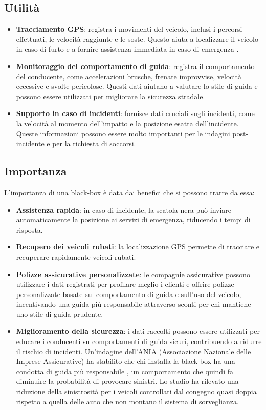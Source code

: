 \documentclass[12pt, a4paper, italian]{report}
\numberwithin{figure}{chapter}
\numberwithin{table}{chapter}
\begin{document}
\subsection{Utilità}
\begin{itemize}
    \item \textbf{Tracciamento GPS}: registra i movimenti del veicolo, inclusi i percorsi effettuati, le velocità raggiunte e le soste. Questo aiuta a localizzare il veicolo in caso di furto e a fornire assistenza immediata in caso di emergenza \cite{khin2018real}.
    \item \textbf{Monitoraggio del comportamento di guida}: registra il comportamento del conducente, come accelerazioni brusche, frenate improvvise, velocità eccessive e svolte pericolose. Questi dati aiutano a valutare lo stile di guida e possono essere utilizzati per migliorare la sicurezza stradale. \cite{hermawan2020acquisition}
    \item \textbf{Supporto in caso di incidenti}: fornisce dati cruciali sugli incidenti, come la velocità al momento dell'impatto e la posizione esatta dell'incidente. Queste informazioni possono essere molto importanti per le indagini post-incidente e per la richiesta di soccorsi. \cite{thompson2010using}
\end{itemize}
\subsection{Importanza}
L'importanza di una black-box è data dai benefici che si possono trarre da essa: 
\begin{itemize}
    \item \textbf{Assistenza rapida}: in caso di incidente, la scatola nera può inviare automaticamente la posizione ai servizi di emergenza, riducendo i tempi di risposta.
    \item \textbf{Recupero dei veicoli rubati}: la localizzazione GPS permette di tracciare e recuperare rapidamente veicoli rubati.
    \item \textbf{Polizze assicurative personalizzate}: le compagnie assicurative possono utilizzare i dati registrati per profilare meglio i clienti e offrire polizze personalizzate basate sul comportamento di guida e sull'uso del veicolo, incentivando una guida più responsabile attraverso sconti per chi mantiene uno stile di guida prudente.
    \item \textbf{Miglioramento della sicurezza}: i dati raccolti possono essere utilizzati per educare i conducenti su comportamenti di guida sicuri, contribuendo a ridurre il rischio di incidenti. Un’indagine dell’ANIA (Associazione Nazionale delle Imprese Assicurative) ha stabilito che chi installa la black-box ha una condotta di guida più responsabile \cite{diminuzioneIncidenti}, un comportamento che quindi fa diminuire la probabilità di provocare sinistri. Lo studio ha rilevato una riduzione della sinistrosità per i veicoli controllati dal congegno quasi doppia rispetto a quella delle auto che non montano il sistema di sorveglianza. 
\end{itemize}
\end{document}

